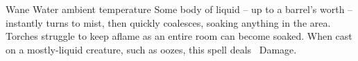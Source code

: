   {}%
  {Wane}%
  {Water}%
  {ambient temperature}%
  {Some body of liquid -- up to a barrel's worth -- instantly turns to mist, then quickly coalesces, soaking anything in the area.}%
  {Torches struggle to keep aflame as an entire room can become soaked.
    When cast on a mostly-liquid creature, such as oozes, this spell deals \showDam~Damage.}

